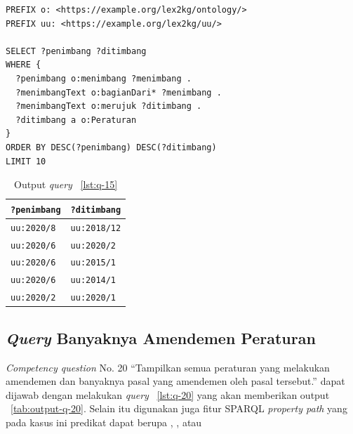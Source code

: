 \begin{listing}[H]
  \begin{verbatim}
PREFIX o: <https://example.org/lex2kg/ontology/>
PREFIX uu: <https://example.org/lex2kg/uu/>

SELECT ?penimbang ?ditimbang
WHERE {
  ?penimbang o:menimbang ?menimbang .
  ?menimbangText o:bagianDari* ?menimbang .
  ?menimbangText o:merujuk ?ditimbang .
  ?ditimbang a o:Peraturan
}
ORDER BY DESC(?penimbang) DESC(?ditimbang)
LIMIT 10

  \end{verbatim}
  \caption{SPARQL \textit{query} untuk \textit{competency question} No. 15}
  \label{lst:q-15}
\end{listing}

\begin{table}
  \centering
  \begin{tabular}{|l|l|} \hline
    \texttt{?penimbang} & \texttt{?ditimbang} \\\hline \hline
    \texttt{uu:2020/8}  & \texttt{uu:2018/12} \\\hline
    \texttt{uu:2020/6}  & \texttt{uu:2020/2}  \\\hline
    \texttt{uu:2020/6}  & \texttt{uu:2015/1}  \\\hline
    \texttt{uu:2020/6}  & \texttt{uu:2014/1}  \\\hline
    \texttt{uu:2020/2}  & \texttt{uu:2020/1}  \\\hline
  \end{tabular}
  \caption{Output \textit{query} \lst~\ref{lst:q-15} }
  \label{tab:output-q-15}
\end{table}

\subsection{\textit{Query} Banyaknya Amendemen Peraturan}
\label{subsec:cq20}

\textit{Competency question} No. 20 ``Tampilkan semua peraturan yang melakukan amendemen dan
banyaknya pasal yang amendemen oleh pasal tersebut.'' dapat dijawab dengan melakukan \textit{query}
\lst~\ref{lst:q-20} yang akan memberikan output \tab~\ref{tab:output-q-20}. Selain itu digunakan
juga fitur SPARQL \textit{property path} \mono{|} yang pada kasus ini predikat dapat berupa
, , atau 

